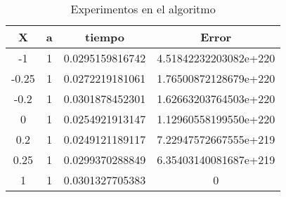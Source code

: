 \begin{table}
\end{table}
\begin{table}{}
 \begin{center}
  \begin{tabular}{|c|c|c|c|}
   \hline
   X     &a& tiempo            & Error \\ \hline
   -1    &1&0.0295159816742    & 4.51842232203082e+220 \\ \hline
   -0.25 &1&0.0272219181061    & 1.76500872128679e+220 \\ \hline
   -0.2  &1&0.0301878452301    & 1.62663203764503e+220 \\ \hline     
   0     &1&0.0254921913147    & 1.12960558199550e+220 \\ \hline
   0.2   &1&0.0249121189117    & 7.22947572667555e+219 \\ \hline
   0.25  &1&0.0299370288849    & 6.35403140081687e+219 \\ \hline
   1     &1&0.0301327705383    & 0 \\ \hline
\end{tabular}
\end{center}
\caption{Experimentos en el algoritmo}
\label{tab}
\end{table}
